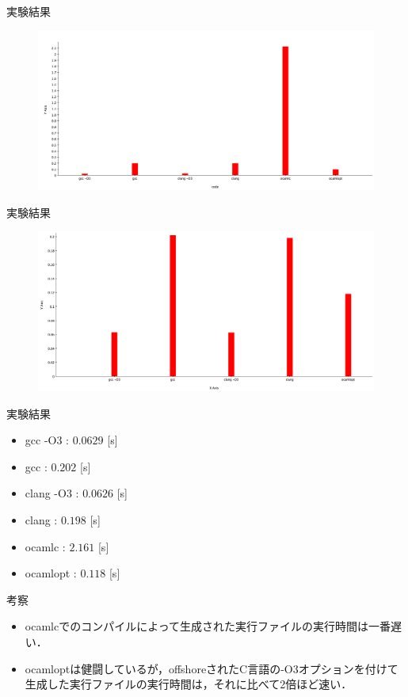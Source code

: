 \documentclass[14pt,dvipdfmx]{beamer}
\theoremstyle{definition}
\begin{document}
\begin{frame}{実験結果}
  \begin{figure}[ht]
    \centering
    \includegraphics[width=130mm]{./img/time01.png}
  \end{figure}
\end{frame}

\begin{frame}{実験結果}
  \begin{figure}[ht]
    \centering
    \includegraphics[width=130mm]{./img/time02.png}
  \end{figure}
\end{frame}

\begin{frame}{実験結果}
  \begin{itemize}
  \item gcc -O3 : $0.0629$ [s]
  \item gcc : $0.202$ [s]
  \item clang -O3 : $0.0626$ [s]
  \item clang : $0.198$ [s]
  \item ocamlc : $2.161$ [s]
  \item ocamlopt : $0.118$ [s]
  \end{itemize}
\end{frame}

\begin{frame}{考察}
  \begin{itemize}
  \item ocamlcでのコンパイルによって生成された実行ファイルの実行時間は一番遅い．
  \item ocamloptは健闘しているが，offshoreされたC言語の-O3オプションを付けて生成した実行ファイルの実行時間は，それに比べて2倍ほど速い．
  \end{itemize}

\end{frame}
\end{document}
